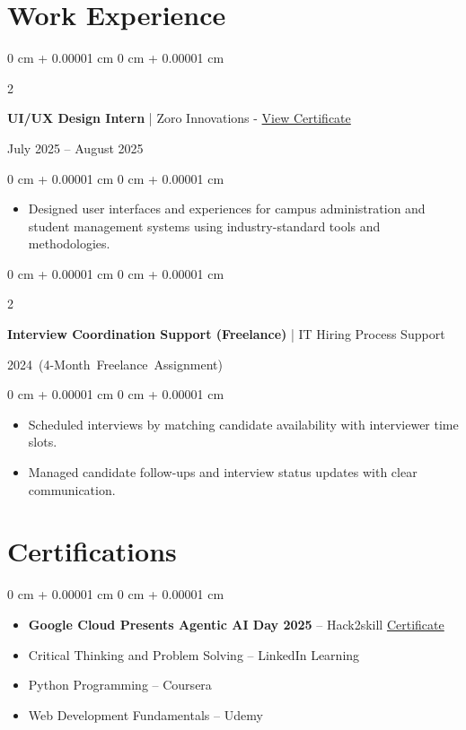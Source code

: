 \documentclass[10pt, a4paper]{article}
\newenvironment{highlights}{
    \begin{itemize}[
        topsep=0.06 cm,
        parsep=0.04 cm,
        partopsep=0pt,
        itemsep=0.02 cm,
        leftmargin=0 cm + 10pt
    ]
}{
    \end{itemize}
}
\newenvironment{onecolentry}{
    \begin{adjustwidth}{
        0 cm + 0.00001 cm
    }{
        0 cm + 0.00001 cm
    }
}{
    \end{adjustwidth}
}
\newenvironment{twocolentry}[2][4.5 cm]{
    \onecolentry
    \def\secondColumn{#2}
    \setcolumnwidth{\fill, #1}
    \begin{paracol}{2}
}{
    \switchcolumn \raggedleft \secondColumn
    \end{paracol}
    \endonecolentry
}
\begin{document}
    \section{Work Experience}

    \begin{twocolentry}{
        July 2025 – August 2025
    }
        \textbf{UI/UX Design Intern} | Zoro Innovations - \href{https://drive.google.com/file/d/1Mdj6kdTXaku3_Z-Vh2tATbli0cOKpZ-h/view?usp=sharing}{View Certificate}
    \end{twocolentry}

    \vspace{0.10 cm}
    \begin{onecolentry}
        \begin{highlights}
            \item Designed user interfaces and experiences for campus administration and student management systems using industry-standard tools and methodologies.
        \end{highlights}
    \end{onecolentry}

    \vspace{0.10 cm}
    \begin{twocolentry}[6.2 cm]{
        \small{\mbox{2024 (4-Month Freelance Assignment)}}
    }
        \textbf{Interview Coordination Support (Freelance)} | IT Hiring Process Support
    \end{twocolentry}

    \vspace{0.10 cm}
    \begin{onecolentry}
        \begin{highlights}
            \item Scheduled interviews by matching candidate availability with interviewer time slots.
            \item Managed candidate follow-ups and interview status updates with clear communication.
        \end{highlights}
    \end{onecolentry}

    \section{Certifications}

    \begin{onecolentry}
        \begin{highlights}
            \item \textbf{Google Cloud Presents Agentic AI Day 2025} – Hack2skill \hfill \href{https://certificate.hack2skill.com/user/aidayideasubmission/2025H2S06AID-I11874}{Certificate}
            \item Critical Thinking and Problem Solving – LinkedIn Learning
            \item Python Programming – Coursera
            \item Web Development Fundamentals – Udemy
        \end{highlights}
    \end{onecolentry}
\end{document}
